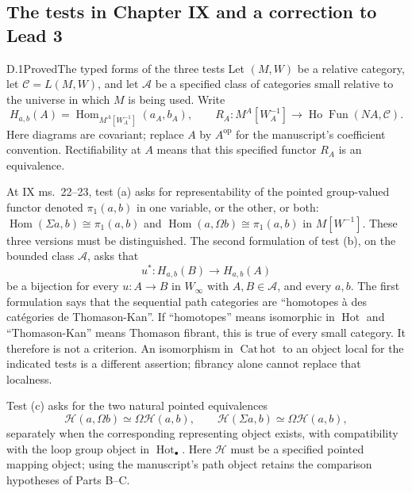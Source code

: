 \subsection{The tests in Chapter IX and a correction to Lead 3}

\begin{result}{D.1}{Proved}{The typed forms of the three tests}
Let $(M,W)$ be a relative category, let $\mathcal C=L(M,W)$, and let
$\mathscr A$ be a specified class of categories small relative to the
universe in which $M$ is being used. Write
\[
 H_{a,b}(A)=\operatorname{Hom}_{M^A[W_A^{-1}]}(a_A,b_A),\qquad
 R_A:M^A[W_A^{-1}]\longrightarrow
       \operatorname{Ho}\operatorname{Fun}(NA,\mathcal C).
\]
Here diagrams are covariant; replace $A$ by $A^{\mathrm{op}}$ for the
manuscript's coefficient convention. Rectifiability at $A$ means that
this specified functor $R_A$ is an equivalence.

At IX ms.~22--23, test (a) asks for representability of the pointed
group-valued functor denoted $\pi_1(a,b)$ in one variable, or the other,
or both: $\operatorname{Hom}(\Sigma a,b)\cong\pi_1(a,b)$ and
$\operatorname{Hom}(a,\Omega b)\cong\pi_1(a,b)$ in $M[W^{-1}]$.
These three versions must be distinguished. The second formulation of
test (b), on the bounded class $\mathscr A$, asks that
\[
 u^*:H_{a,b}(B)\longrightarrow H_{a,b}(A)
\]
be a bijection for every $u:A\to B$ in $W_\infty$ with $A,B\in\mathscr A$,
and every $a,b$. The first formulation says that the sequential path
categories are ``homotopes \`a des cat\'egories de Thomason-Kan''.
If ``homotopes'' means isomorphic in $\operatorname{Hot}$ and
``Thomason-Kan'' means Thomason fibrant, this is true of every small
category. It therefore is not a criterion. An isomorphism in
$\operatorname{Cat\,hot}$ to an object local for the indicated tests is
a different assertion; fibrancy alone cannot replace that localness.

Test (c) asks for the two natural pointed equivalences
\[
 \mathcal H(a,\Omega b)\simeq\Omega\mathcal H(a,b),\qquad
 \mathcal H(\Sigma a,b)\simeq\Omega\mathcal H(a,b),                 \tag{D.1.1}
\]
separately when the corresponding representing object exists, with
compatibility with the loop group object in $\operatorname{Hot}_\bullet$.
Here $\mathcal H$ must be a specified pointed mapping object; using the
manuscript's path object retains the comparison hypotheses of Parts B--C.
\end{result}
